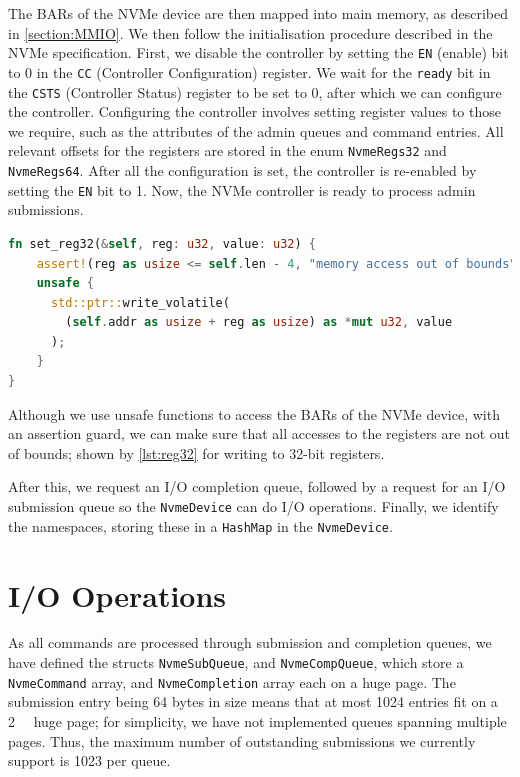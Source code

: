 The BARs of the NVMe device are then mapped into main memory, as described in \autoref{section:MMIO}. We then follow the initialisation procedure described in the NVMe specification. First, we disable the controller by setting the \texttt{EN} (enable) bit to 0 in the \texttt{CC} (Controller Configuration) register. We wait for the \texttt{ready} bit in the \texttt{CSTS} (Controller Status) register to be set to 0, after which we can configure the controller. Configuring the controller involves setting register values to those we require, such as the attributes of the admin queues and command entries. All relevant offsets for the registers are stored in the enum \texttt{NvmeRegs32} and \texttt{NvmeRegs64}. After all the configuration is set, the controller is re-enabled by setting the \texttt{EN} bit to 1. Now, the NVMe controller is ready to process admin submissions.

\begin{lstlisting}[language=Rust, label=lst:reg32,caption=Writing to a 32 bit register]
fn set_reg32(&self, reg: u32, value: u32) {
    assert!(reg as usize <= self.len - 4, "memory access out of bounds");
    unsafe {
      std::ptr::write_volatile(
        (self.addr as usize + reg as usize) as *mut u32, value
      );
    }
}
\end{lstlisting}

Although we use unsafe functions to access the BARs of the NVMe device, with an assertion guard, we can make sure that all accesses to the registers are not out of bounds; shown by \autoref{lst:reg32} for writing to 32-bit registers.

After this, we request an I/O completion queue, followed by a request for an I/O submission queue so the \texttt{NvmeDevice} can do I/O operations. Finally, we identify the namespaces, storing these in a \texttt{HashMap} in the \texttt{NvmeDevice}.

\section{I/O Operations}\label{subsection:io}
As all commands are processed through submission and completion queues, we have defined the structs \texttt{NvmeSubQueue}, and \texttt{NvmeCompQueue}, which store a \texttt{NvmeCommand} array, and \texttt{NvmeCompletion} array each on a huge page. The submission entry being 64 bytes in size means that at most 1024 entries fit on a \qty{2}{\mebi\byte} huge page; for simplicity, we have not implemented queues spanning multiple pages. Thus, the maximum number of outstanding submissions we currently support is 1023 per queue.

